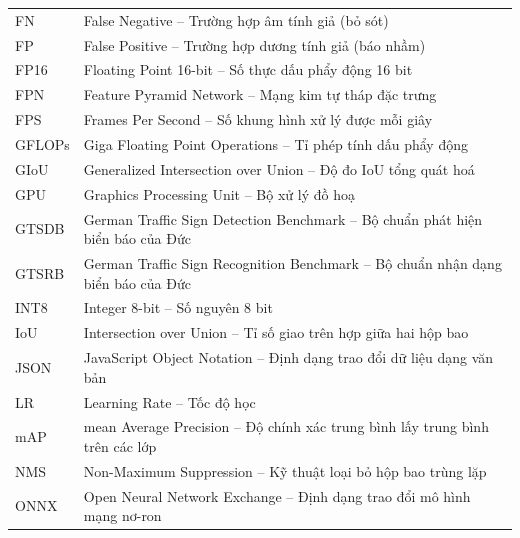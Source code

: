 \begin{longtable}{>{\centering\arraybackslash}p{3.2cm} p{10.5cm}}
    FN & False Negative -- Trường hợp âm tính giả (bỏ sót) \\

    FP & False Positive -- Trường hợp dương tính giả (báo nhầm) \\

    FP16 & Floating Point 16-bit -- Số thực dấu phẩy động 16 bit \\

    FPN & Feature Pyramid Network -- Mạng kim tự tháp đặc trưng \\

    FPS & Frames Per Second -- Số khung hình xử lý được mỗi giây \\

    GFLOPs & Giga Floating Point Operations -- Tỉ phép tính dấu phẩy động \\

    GIoU & Generalized Intersection over Union -- Độ đo IoU tổng quát hoá \\

    GPU & Graphics Processing Unit -- Bộ xử lý đồ hoạ \\

    GTSDB & German Traffic Sign Detection Benchmark -- Bộ chuẩn phát hiện biển báo của Đức \\

    GTSRB & German Traffic Sign Recognition Benchmark -- Bộ chuẩn nhận dạng biển báo của Đức \\

    INT8 & Integer 8-bit -- Số nguyên 8 bit \\

    IoU & Intersection over Union -- Tỉ số giao trên hợp giữa hai hộp bao \\

    JSON & JavaScript Object Notation -- Định dạng trao đổi dữ liệu dạng văn bản \\

    LR & Learning Rate -- Tốc độ học \\

    mAP & mean Average Precision -- Độ chính xác trung bình lấy trung bình trên các lớp \\

    NMS & Non-Maximum Suppression -- Kỹ thuật loại bỏ hộp bao trùng lặp \\

    ONNX & Open Neural Network Exchange -- Định dạng trao đổi mô hình mạng nơ-ron \\


\end{longtable}
